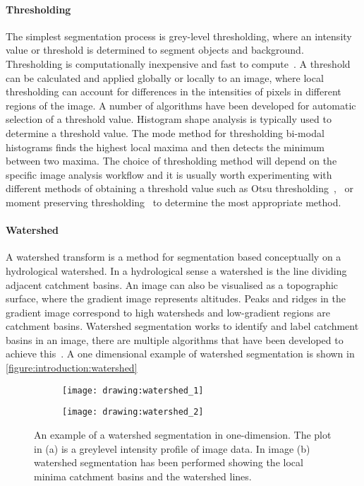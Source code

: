 \paragraph{Thresholding} The simplest segmentation process is grey-level thresholding, where an intensity value or threshold is determined to segment objects and background. Thresholding is computationally inexpensive and fast to compute~\cite{Sonka2007}. A threshold can be calculated and applied globally or locally to an image, where local thresholding can account for differences in the intensities of pixels in different regions of the image. A number of algorithms have been developed for automatic selection of a threshold value. Histogram shape analysis is typically used to determine a threshold value. The mode method for thresholding bi-modal histograms finds the highest local maxima and then detects the minimum between two maxima. The choice of thresholding method will depend on the specific image analysis workflow and it is usually worth experimenting with different methods of obtaining a threshold value such as Otsu thresholding~\cite{Otsu1979},~\cite{Kittler1986} or moment preserving thresholding~\cite{Tsai1985} to determine the most appropriate method.

\paragraph{Watershed} A watershed transform is a method for segmentation based conceptually on a hydrological watershed. In a hydrological sense a watershed is the line dividing adjacent catchment basins. An image can also be visualised as a topographic surface, where the gradient image represents altitudes. Peaks and ridges in the gradient image correspond to high watersheds and low-gradient regions are catchment basins. Watershed segmentation works to identify and label catchment basins in an image, there are multiple algorithms that have been developed to achieve this~\cite{Roerdink2000}. A one dimensional example of watershed segmentation is shown in \autoref{figure:introduction:watershed}

\begin{figure}[htbp!]\centering
	\begin{subfigure}[b]{0.48\linewidth}
		\centering
		\texttt{[image: drawing:watershed\_1]}
		\caption{}
		\label{figure:introduction:watershed_1}
	\end{subfigure}
	\begin{subfigure}[b]{0.48\linewidth}
		\centering
		\texttt{[image: drawing:watershed\_2]}
		\caption{}
		\label{figure:introduction:watershed_2}
	\end{subfigure}
\caption[Watershed]{An example of a watershed segmentation in one-dimension. The plot in (a) is a greylevel intensity profile of image data. In image (b) watershed segmentation has been performed showing the local minima catchment basins and the watershed lines.}
\label{figure:introduction:watershed}
\end{figure}

